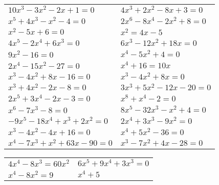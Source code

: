 \documentclass[12pt,a4paper]{article}
\begin{document}
\begin{enumerate}[1.]
\begin{enumerate}[1)]
\begin{tabular}{p{7cm} p{7cm}}
				\item $10x^3-3x^2-2x+1=0$		& \item $4x^3+2x^2-8x+3=0$ \\
				\item $x^5+4x^3-x^2-4=0$		& \item $2x^6-8x^4-2x^2+8=0$ \\
				\item $x^2-5x+6=0$ 				& \item $x^2=4x-5$\\
				\item $4x^5-2x^4+6x^3=0$ 		& \item $6x^3-12x^2+18x=0$\\
				\item $9x^2-16=0$				& \item $x^4-5x^2+4=0$\\
				\item $2x^4-15x^2-27=0 $ 		& \item $x^4+16=10x$\\
				\item $x^3-4x^2+8x-16=0 $ 		& \item $x^3-4x^2+8x=0$\\
				\item $x^3+4x^2-2x-8=0 $ 		& \item $3x^3+5x^2-12x-20=0$\\
				\item $2x^5+3x^4-2x-3=0 $ 		& \item $x^8+x^4-2=0$\\
				\item $x^6-7x^3-8=0 $ 			& \item $8x^5-32x^3-x^2+4=0$\\
				\item $-9x^5-18x^4+x^3+2x^2=0 $ & \item $2x^4+3x^3-9x^2=0$\\
				\item $x^3-4x^2-4x+16=0$ 		& \item $x^4+5x^2-36=0$\\
				\item $x^4-7x^3+x^2+63x-90=0$ 	& \item $x^3 - 7x^2 + 4x - 28 = 0$\\ \end{tabular} \end{enumerate}
			
			
				\begin{enumerate}[1)] \begin{tabular}{p{7cm} p{7cm}} 
				\item $4x^4-8x^3=60x^2$ 	& \vspace{0.4cm}\item $6x^5+9x^4+3x^3=0 $\\
				\item $x^4-8x^2=9 $ 	& \item $x^4+5$\\
				\end{tabular} \end{enumerate}
	\end{enumerate}
\end{document}
